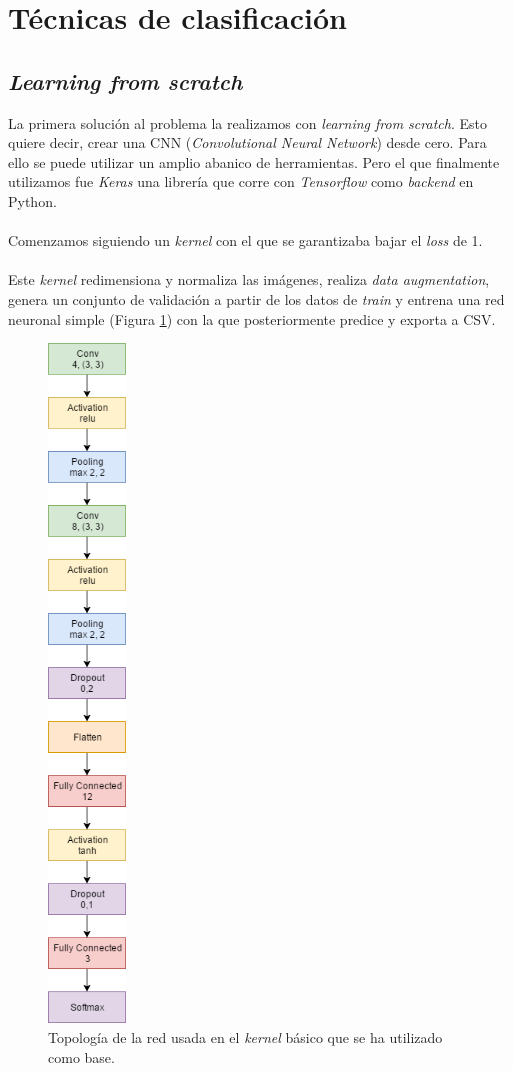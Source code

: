 \section{Técnicas de clasificación}

\subsection{\textit{Learning from scratch}}

La primera solución al problema la realizamos con \textit{learning from scratch}. Esto quiere decir, crear una CNN (\textit{Convolutional Neural Network}) desde cero. Para ello se puede utilizar un amplio abanico de herramientas. Pero el que finalmente utilizamos fue \textit{Keras} una librería que corre con \textit{Tensorflow} como \textit{backend} en Python.
\\ \\
Comenzamos siguiendo un \textit{kernel} \cite{StartKernel} con el que se garantizaba bajar el \textit{loss} de 1.
\\ \\
Este \textit{kernel} redimensiona y normaliza las imágenes, realiza \textit{data augmentation}, genera un conjunto de validación a partir de los datos de \textit{train} y entrena una red neuronal simple (Figura \ref{fig:kernel-cnn}) con la que posteriormente predice y exporta a CSV.

\begin{figure}[H]
	\centering
	\includegraphics[height=18cm]{img/kernel-cnn}
	\caption{Topología de la red usada en el \textit{kernel} básico que se ha utilizado como base.}
	\label{fig:kernel-cnn}
\end{figure}

